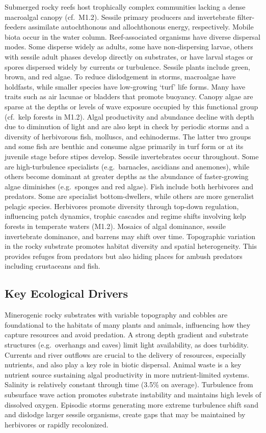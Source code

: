 \documentclass[
  letterpaper,
  DIV=11,
  numbers=noendperiod]{scrartcl}
\begin{document}
Submerged rocky reefs host trophically complex communities lacking a
dense macroalgal canopy (cf.~M1.2). Sessile primary producers and
invertebrate filter-feeders assimilate autochthonous and allochthonous
energy, respectively. Mobile biota occur in the water column.
Reef-associated organisms have diverse dispersal modes. Some disperse
widely as adults, some have non-dispersing larvae, others with sessile
adult phases develop directly on substrates, or have larval stages or
spores dispersed widely by currents or turbulence. Sessile plants
include green, brown, and red algae. To reduce dislodgement in storms,
macroalgae have holdfasts, while smaller species have low-growing `turf'
life forms. Many have traits such as air lacunae or bladders that
promote buoyancy. Canopy algae are sparse at the depths or levels of
wave exposure occupied by this functional group (cf.~kelp forests in
M1.2). Algal productivity and abundance decline with depth due to
diminution of light and are also kept in check by periodic storms and a
diversity of herbivorous fish, molluscs, and echinoderms. The latter two
groups and some fish are benthic and consume algae primarily in turf
form or at its juvenile stage before stipes develop. Sessile
invertebrates occur throughout. Some are high-turbulence specialists
(e.g.~barnacles, ascidians and anemones), while others become dominant
at greater depths as the abundance of faster-growing algae diminishes
(e.g.~sponges and red algae). Fish include both herbivores and
predators. Some are specialist bottom-dwellers, while others are more
generalist pelagic species. Herbivores promote diversity through
top-down regulation, influencing patch dynamics, trophic cascades and
regime shifts involving kelp forests in temperate waters (M1.2). Mosaics
of algal dominance, sessile invertebrate dominance, and barrens may
shift over time. Topographic variation in the rocky substrate promotes
habitat diversity and spatial heterogeneity. This provides refuges from
predators but also hiding places for ambush predators including
crustaceans and fish.

\subsection{Key Ecological Drivers}\label{key-ecological-drivers-31}

Minerogenic rocky substrates with variable topography and cobbles are
foundational to the habitats of many plants and animals, influencing how
they capture resources and avoid predation. A strong depth gradient and
substrate structures (e.g.~overhangs and caves) limit light
availability, as does turbidity. Currents and river outflows are crucial
to the delivery of resources, especially nutrients, and also play a key
role in biotic dispersal. Animal waste is a key nutrient source
sustaining algal productivity in more nutrient-limited systems. Salinity
is relatively constant through time (3.5\% on average). Turbulence from
subsurface wave action promotes substrate instability and maintains high
levels of dissolved oxygen. Episodic storms generating more extreme
turbulence shift sand and dislodge larger sessile organisms, create gaps
that may be maintained by herbivores or rapidly recolonized.
\end{document}
